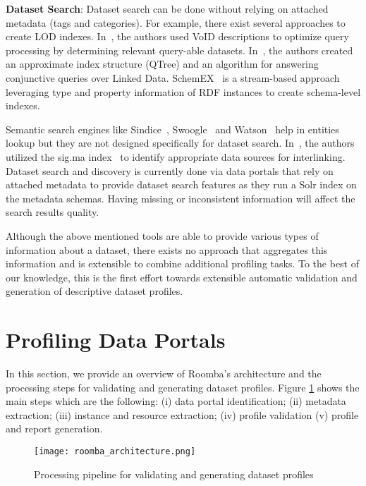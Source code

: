 \textbf{Dataset Search}: Dataset search can be done without relying on attached metadata (tags and categories). For example, there exist several approaches to create LOD indexes. In~\cite{Alexander:LDOW:09}, the authors used VoID descriptions to optimize query processing by determining relevant query-able datasets. In~\cite{Harth:WWW:10}, the authors created an approximate index structure (QTree) and an algorithm for answering conjunctive queries over Linked Data. SchemEX~\cite{Konrath:WebSemJorunal:12} is a stream-based approach leveraging type and property information of RDF instances to create schema-level indexes.

Semantic search engines like Sindice~\cite{Delbru:ESWC:10}, Swoogle~\cite{Ding:CIKM:04} and Watson~\cite{daquin:SemWebJorunal:11} help in entities lookup but they are not designed specifically for dataset search. In~\cite{Nikolov:JIST:11}, the authors utilized the sig.ma index~\cite{Tummarello:WebSemJorunal:10} to identify appropriate data sources for interlinking. Dataset search and discovery is currently done via data portals that rely on attached metadata to provide dataset search features as they run a Solr index on the metadata schemas. Having missing or inconsistent information will affect the search results quality.

Although the above mentioned tools are able to provide various types of information about a dataset, there exists no approach that aggregates this information and is extensible to combine additional profiling tasks. To the best of our knowledge, this is the first effort towards extensible automatic validation and generation of descriptive dataset profiles.


\section{Profiling Data Portals}
\label{section:roomba-framework}

In this section, we provide an overview of Roomba's architecture and the processing steps for validating and generating dataset profiles. Figure \ref{fig:Roomba_architecture} shows the main steps which are the following: (i) data portal identification; (ii) metadata extraction; (iii) instance and resource extraction; (iv) profile validation (v) profile and report generation.

\begin{figure}[t!]
  \centering
  \texttt{[image: roomba\_architecture.png]}
  \caption{Processing pipeline for validating and generating dataset profiles}
  \label{fig:Roomba_architecture}
\end{figure}

